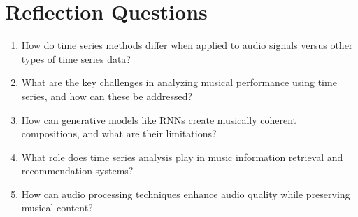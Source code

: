\section*{Reflection Questions}

\begin{enumerate}
\item How do time series methods differ when applied to audio signals versus other types of time series data?

\item What are the key challenges in analyzing musical performance using time series, and how can these be addressed?

\item How can generative models like RNNs create musically coherent compositions, and what are their limitations?

\item What role does time series analysis play in music information retrieval and recommendation systems?

\item How can audio processing techniques enhance audio quality while preserving musical content?
\end{enumerate}

